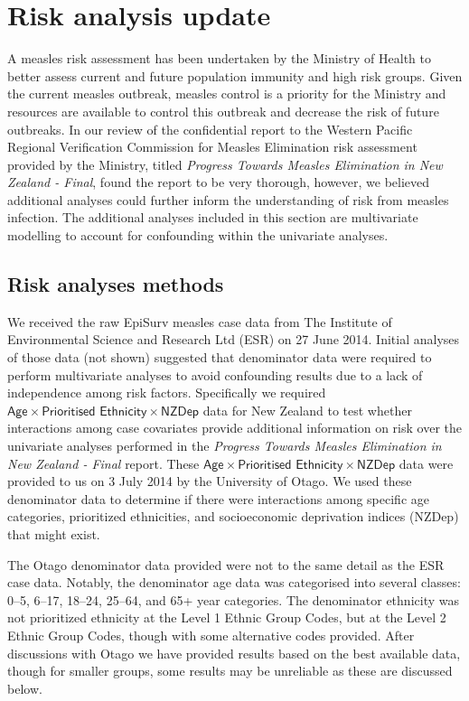 \documentclass{article}
\begin{document}
\section{Risk analysis update}
\label{sub:risk_analyses}

A measles risk assessment has been undertaken by the Ministry of Health to better assess current and future population immunity and high risk groups. Given the current measles outbreak, measles control is a priority for the Ministry and resources are available to control this outbreak and decrease the risk of future outbreaks. In our review of the confidential report to the Western Pacific Regional Verification Commission for Measles Elimination risk assessment provided by the Ministry, titled \emph {Progress Towards Measles Elimination in New Zealand - Final}, found the report to be very thorough, however, we believed additional analyses could further inform the understanding of risk from measles infection. The additional analyses included in this section are multivariate modelling to account for confounding within the univariate analyses.

\subsection{Risk analyses methods}
We received the raw EpiSurv measles case data from The Institute of Environmental Science and Research Ltd (ESR) on 27 June 2014. Initial analyses of those data (not shown) suggested that denominator data were required to perform multivariate analyses to avoid confounding results due to a lack of independence among risk factors. Specifically we required $\textsf{Age} \times \textsf{Prioritised Ethnicity} \times \textsf{NZDep}$ data for New Zealand to test whether interactions among case covariates provide additional information on risk over the univariate analyses performed in the \emph{Progress Towards Measles Elimination in New Zealand - Final} report. These $\textsf{Age} \times \textsf{Prioritised Ethnicity} \times \textsf{NZDep}$ data were provided to us on 3 July 2014 by the University of Otago. We used these denominator data to determine if there were interactions among specific age categories, prioritized ethnicities, and socioeconomic deprivation indices (NZDep) that might exist.

The Otago denominator data provided were not to the same detail as the ESR case data. Notably, the denominator age data was categorised into several classes: 0--5, 6--17, 18--24, 25--64, and 65+ year categories. The denominator ethnicity was not prioritized ethnicity at the Level 1 Ethnic Group Codes, but at the Level 2 Ethnic Group Codes, though with some alternative codes provided. After discussions with Otago we have provided results based on the best available data, though for smaller groups, some results may be unreliable as these are discussed below.
\end{document}
